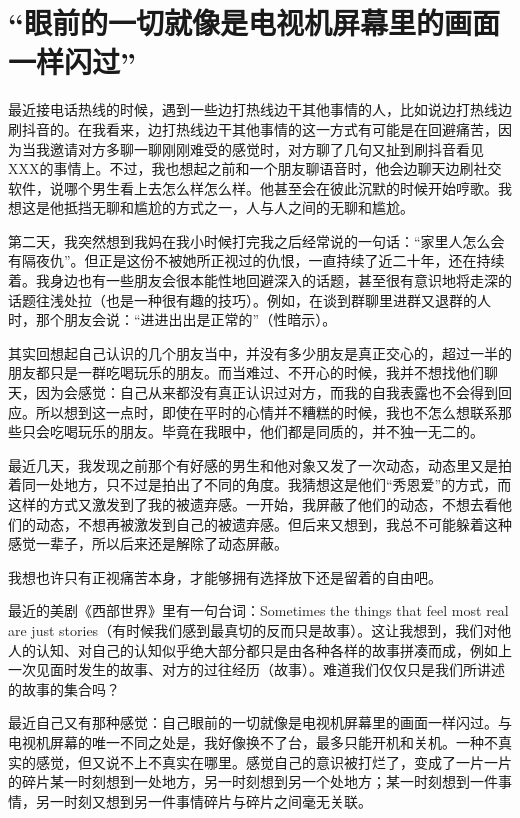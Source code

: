 \chapter{“眼前的一切就像是电视机屏幕里的画面一样闪过”}






最近接电话热线的时候，遇到一些边打热线边干其他事情的人，比如说边打热线边刷抖音的。在我看来，边打热线边干其他事情的这一方式有可能是在回避痛苦，因为当我邀请对方多聊一聊刚刚难受的感觉时，对方聊了几句又扯到刷抖音看见XXX的事情上。不过，我也想起之前和一个朋友聊语音时，他会边聊天边刷社交软件，说哪个男生看上去怎么样怎么样。他甚至会在彼此沉默的时候开始哼歌。我想这是他抵挡无聊和尴尬的方式之一，人与人之间的无聊和尴尬。

第二天，我突然想到我妈在我小时候打完我之后经常说的一句话：“家里人怎么会有隔夜仇”。但正是这份不被她所正视过的仇恨，一直持续了近二十年，还在持续着。我身边也有一些朋友会很本能性地回避深入的话题，甚至很有意识地将走深的话题往浅处拉（也是一种很有趣的技巧）。例如，在谈到群聊里进群又退群的人时，那个朋友会说：“进进出出是正常的”（性暗示）。

其实回想起自己认识的几个朋友当中，并没有多少朋友是真正交心的，超过一半的朋友都只是一群吃喝玩乐的朋友。而当难过、不开心的时候，我并不想找他们聊天，因为会感觉：自己从来都没有真正认识过对方，而我的自我表露也不会得到回应。所以想到这一点时，即使在平时的心情并不糟糕的时候，我也不怎么想联系那些只会吃喝玩乐的朋友。毕竟在我眼中，他们都是同质的，并不独一无二的。

最近几天，我发现之前那个有好感的男生和他对象又发了一次动态，动态里又是拍着同一处地方，只不过是拍出了不同的角度。我猜想这是他们“秀恩爱”的方式，而这样的方式又激发到了我的被遗弃感。一开始，我屏蔽了他们的动态，不想去看他们的动态，不想再被激发到自己的被遗弃感。但后来又想到，我总不可能躲着这种感觉一辈子，所以后来还是解除了动态屏蔽。

我想也许只有正视痛苦本身，才能够拥有选择放下还是留着的自由吧。

最近的美剧《西部世界》里有一句台词：Sometimes the things that feel most real are just stories（有时候我们感到最真切的反而只是故事）。这让我想到，我们对他人的认知、对自己的认知似乎绝大部分都只是由各种各样的故事拼凑而成，例如上一次见面时发生的故事、对方的过往经历（故事）。难道我们仅仅只是我们所讲述的故事的集合吗？

最近自己又有那种感觉：自己眼前的一切就像是电视机屏幕里的画面一样闪过。与电视机屏幕的唯一不同之处是，我好像换不了台，最多只能开机和关机。一种不真实的感觉，但又说不上不真实在哪里。感觉自己的意识被打烂了，变成了一片一片的碎片\pozhehao{}某一时刻想到一处地方，另一时刻想到另一个处地方；某一时刻想到一件事情，另一时刻又想到另一件事情\pozhehao{}碎片与碎片之间毫无关联。

